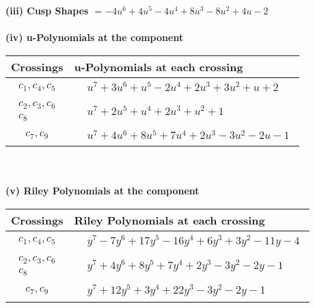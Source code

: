 \documentclass[1p]{elsarticle_modified}
\theoremstyle{definition}
\begin{document}
\flushleft \textbf{(iii) Cusp Shapes $= -4 u^6+4 u^5-4 u^4+8 u^3-8 u^2+4 u-2$}\\~\\
\newpage\renewcommand{\arraystretch}{1}
\flushleft \textbf{(iv) u-Polynomials at the component}\newline \\
\begin{tabular}{m{50pt}|m{274pt}}
Crossings & \hspace{64pt}u-Polynomials at each crossing \\
\hline $$\begin{aligned}c_{1},c_{4},c_{5}\end{aligned}$$&$\begin{aligned}
&u^7+3 u^6+u^5-2 u^4+2 u^3+3 u^2+u+2
\end{aligned}$\\
\hline $$\begin{aligned}c_{2},c_{3},c_{6}\\c_{8}\end{aligned}$$&$\begin{aligned}
&u^7+2 u^5+u^4+2 u^3+u^2+1
\end{aligned}$\\
\hline $$\begin{aligned}c_{7},c_{9}\end{aligned}$$&$\begin{aligned}
&u^7+4 u^6+8 u^5+7 u^4+2 u^3-3 u^2-2 u-1
\end{aligned}$\\
\hline
\end{tabular}\\~\\
\newpage\renewcommand{\arraystretch}{1}
\flushleft \textbf{(v) Riley Polynomials at the component}\newline \\
\begin{tabular}{m{50pt}|m{274pt}}
Crossings & \hspace{64pt}Riley Polynomials at each crossing \\
\hline $$\begin{aligned}c_{1},c_{4},c_{5}\end{aligned}$$&$\begin{aligned}
&y^7-7 y^6+17 y^5-16 y^4+6 y^3+3 y^2-11 y-4
\end{aligned}$\\
\hline $$\begin{aligned}c_{2},c_{3},c_{6}\\c_{8}\end{aligned}$$&$\begin{aligned}
&y^7+4 y^6+8 y^5+7 y^4+2 y^3-3 y^2-2 y-1
\end{aligned}$\\
\hline $$\begin{aligned}c_{7},c_{9}\end{aligned}$$&$\begin{aligned}
&y^7+12 y^5+3 y^4+22 y^3-3 y^2-2 y-1
\end{aligned}$\\
\hline
\end{tabular}\\~\\
\end{document}
